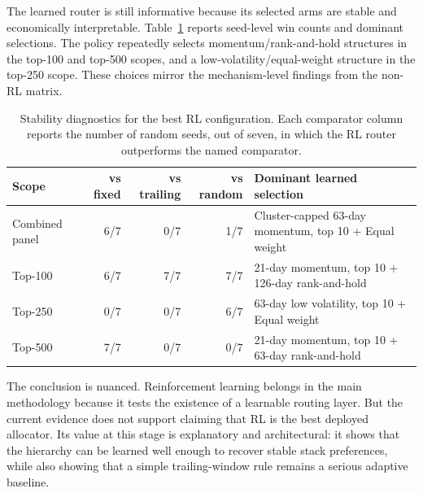 \documentclass[11pt,a4paper]{article}
\begin{document}
The learned router is still informative because its selected arms are stable and economically interpretable. Table~\ref{tab:rl_stability} reports seed-level win counts and dominant selections. The policy repeatedly selects momentum/rank-and-hold structures in the top-100 and top-500 scopes, and a low-volatility/equal-weight structure in the top-250 scope. These choices mirror the mechanism-level findings from the non-RL matrix.
\begin{table}[H]
\centering
\caption{Stability diagnostics for the best RL configuration. Each comparator column reports the number of random seeds, out of seven, in which the RL router outperforms the named comparator.}
\label{tab:rl_stability}
\scriptsize
\begin{tabular}{p{1.55cm}rrrp{6.55cm}}
\toprule
Scope & vs fixed & vs trailing & vs random & Dominant learned selection \\
\midrule
Combined panel & 6/7 & 0/7 & 1/7 & Cluster-capped 63-day momentum, top 10 + Equal weight \\
Top-100 & 6/7 & 7/7 & 7/7 & 21-day momentum, top 10 + 126-day rank-and-hold \\
Top-250 & 0/7 & 0/7 & 6/7 & 63-day low volatility, top 10 + Equal weight \\
Top-500 & 7/7 & 0/7 & 0/7 & 21-day momentum, top 10 + 63-day rank-and-hold \\
\bottomrule
\end{tabular}
\end{table}

The conclusion is nuanced. Reinforcement learning belongs in the main methodology because it tests the existence of a learnable routing layer. But the current evidence does not support claiming that RL is the best deployed allocator. Its value at this stage is explanatory and architectural: it shows that the hierarchy can be learned well enough to recover stable stack preferences, while also showing that a simple trailing-window rule remains a serious adaptive baseline.
\end{document}
